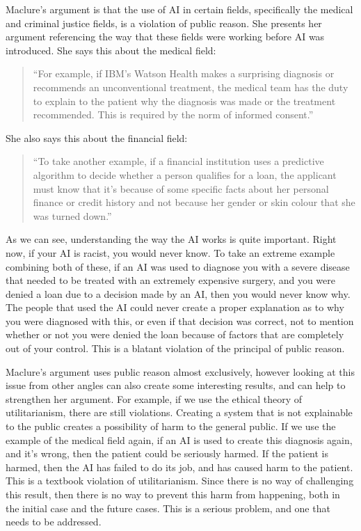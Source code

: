 \documentclass[12pt]{article}
\begin{document}
    Maclure's argument is that the use of AI in certain fields, specifically the medical and criminal justice fields,
    is a violation of public reason. She presents her argument referencing the way that these fields were working
    before AI was introduced. She says this about the medical field:
    \begin{quote}
        ``For example, if IBM's Watson Health makes a surprising diagnosis or recommends an unconventional treatment,
        the medical team has the duty to explain to the patient why the diagnosis was made or the treatment
        recommended. This is required by the norm of informed consent.'' \autocite{MaclureAI}
    \end{quote}
    She also says this about the financial field:
    \begin{quote}
        ``To take another example, if a financial institution uses a predictive algorithm to decide whether a
        person qualifies for a loan, the applicant must know that it’s because of some specific facts about her
        personal finance or credit history and not because her gender or skin colour that she was turned down.'' \autocite{MaclureAI}
    \end{quote}
    As we can see, understanding the way the AI works is quite important. Right now, if your AI is racist, you would
    never know. To take an extreme example combining both of these, if an AI was used to diagnose you with a severe
    disease that needed to be treated with an extremely expensive surgery, and you were denied a loan due to a decision
    made by an AI, then you would never know why. The people that used the AI could never create a proper explanation
    as to why you were diagnosed with this, or even if that decision was correct, not to mention whether or not you were
    denied the loan because of factors that are completely out of your control. This is a blatant violation of the
    principal of public reason.

    Maclure's argument uses public reason almost exclusively, however looking at this issue from other angles can also
    create some interesting results, and can help to strengthen her argument. For example, if we use the ethical theory
    of utilitarianism, there are still violations. Creating a system that is not explainable to the public creates a 
    possibility of harm to the general public. If we use the example of the medical field again, if an AI is used to 
    create this diagnosis again, and it's wrong, then the patient could be seriously harmed. If the patient is harmed,
    then the AI has failed to do its job, and has caused harm to the patient. This is a textbook violation of utilitarianism.
    Since there is no way of challenging this result, then there is no way to prevent this harm from happening, both in
    the initial case and the future cases. This is a serious problem, and one that needs to be addressed.
\end{document}
